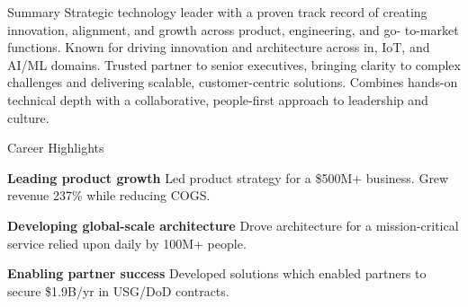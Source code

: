 \documentclass{resume} %
\begin{document}
\vspace{-1em}
\begin{rSummary}{Summary}
  Strategic technology leader with a proven track record of creating innovation, alignment, and growth across product, engineering, and go- to-market functions. Known for driving innovation and architecture across in, IoT, and AI/ML domains.
  \newline \newline
  Trusted partner to senior executives, bringing clarity to complex challenges and delivering scalable, customer-centric solutions. Combines hands-on technical depth with a collaborative, people-first approach to leadership and culture.
\end{rSummary}
\begin{rAchievements}{Career Highlights}
  \item {\footnotesize\textbf{Leading product growth}} \newline Led product strategy for a \$500M+ business. Grew revenue 237\% while reducing COGS.
  \item {\footnotesize\textbf{Developing global-scale architecture}} \newline Drove architecture for a mission-critical service relied upon daily by 100M+ people.
  \item {\footnotesize\textbf{Enabling partner success}} \newline Developed solutions which enabled partners to secure \$1.9B/yr in USG/DoD contracts.
\end{rAchievements}
\end{document}
